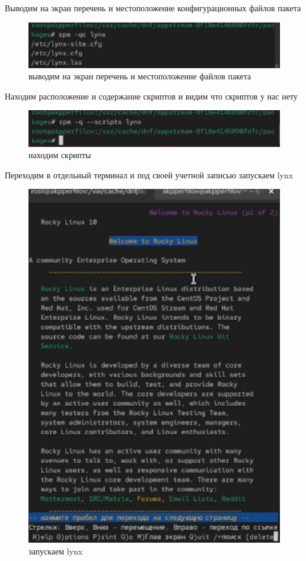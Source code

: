\documentclass[
  english,
  russian,
  12pt,
  a4paper,
  DIV=11,
  numbers=noendperiod]{scrreprt}
\begin{document}
Выводим на экран перечень и местоположение конфигурационных файлов
пакета

\begin{figure}

{\centering \includegraphics[width=0.71\linewidth,height=\textheight,keepaspectratio]{image/28.jpg}

}

\caption{выводим на экран перечень и местоположение файлов пакета}

\end{figure}%

Находим расположение и содержание скриптов и видим что скриптов у нас
нету

\begin{figure}

{\centering \includegraphics[width=0.71\linewidth,height=\textheight,keepaspectratio]{image/29.jpg}

}

\caption{находим скрипты}

\end{figure}%

Переходим в отдельный терминал и под своей учетной записью запускаем
lynx

\begin{figure}

{\centering \includegraphics[width=0.71\linewidth,height=\textheight,keepaspectratio]{image/30.jpg}

}

\caption{запускаем lynx}

\end{figure}%
\end{document}
